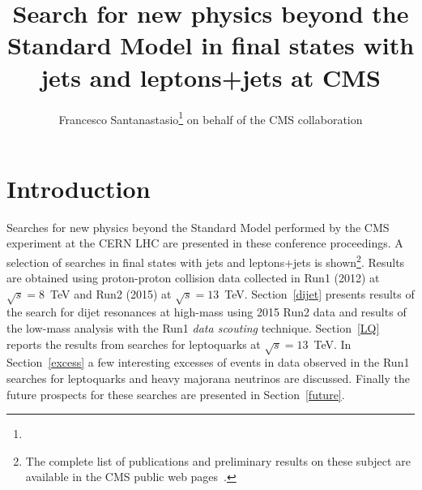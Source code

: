 \documentclass[epj]{webofc}
\begin{document}
%
\title{Search for new physics beyond the Standard Model in final states with jets and
  leptons+jets at CMS}
%
%

\author{Francesco
  Santanastasio\fnsep\thanks{}
  on behalf of the CMS collaboration
}


%
\maketitle
%
\section{Introduction}
\label{intro}
Searches for new physics beyond the Standard Model performed 
by the CMS experiment at the CERN LHC are presented in these conference proceedings.
A selection of searches in final states with jets and leptons+jets is
shown\footnote{The complete list of
publications and preliminary results on these subject are available 
in the CMS public web pages~\cite{EXOpages}.}. Results are obtained using proton-proton collision data 
collected in Run1 (2012) at $\sqrt{s}=8$~TeV and Run2 (2015) at $\sqrt{s}=13$~TeV.
Section~\ref{dijet} presents results of the search for dijet
resonances at high-mass using 2015 Run2 data and results 
of the low-mass analysis with the Run1 {\it data scouting} technique. 
Section~\ref{LQ} reports the results from searches for leptoquarks at
$\sqrt{s}=13$~TeV. In Section~\ref{excess} a few interesting excesses
of events in data observed in the Run1 searches for leptoquarks and
heavy majorana neutrinos are discussed. Finally the future prospects for
these searches are presented in Section~\ref{future}.
\end{document}
